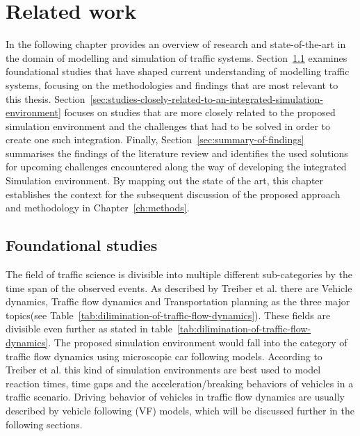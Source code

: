 \chapter{Related work}\label{ch:related-work}
    In the following chapter provides an overview of research and state-of-the-art in the domain of modelling and simulation of traffic systems.
    Section~\ref{sec:foundational-studies} examines foundational studies that have shaped current understanding of modelling traffic systems, focusing on the methodologies and findings that are most relevant to this thesis.
    Section~\ref{sec:studies-closely-related-to-an-integrated-simulation-environment} focuses on studies that are more closely related to the proposed simulation environment and the challenges that had to be solved in order to create one such integration.
    Finally, Section~\ref{sec:summary-of-findings} summarises the findings of the literature review and identifies the used solutions for upcoming challenges encountered along the way of developing the integrated Simulation environment.
    By mapping out the state of the art, this chapter establishes the context for the subsequent discussion of the proposed approach and methodology in Chapter~\ref{ch:methods}.


    \section{Foundational studies}\label{sec:foundational-studies}
        The field of traffic science is divisible into multiple different sub-categories by the time span of the observed events.
        As described by Treiber et al. \cite{treiber2013traffic} there are Vehicle dynamics, Traffic flow dynamics and Transportation planning as the three major topics(see Table~\ref{tab:dilimination-of-traffic-flow-dynamics}).
        These fields are divisible even further as stated in table~\ref{tab:dilimination-of-traffic-flow-dynamics}.
        The proposed simulation environment would fall into the category of traffic flow dynamics using microscopic car following models.
        According to Treiber et al. this kind of simulation environments are best used to model reaction times, time gaps and the acceleration/breaking behaviors of vehicles in a traffic scenario.
        Driving behavior of vehicles in traffic flow dynamics are usually described by vehicle following (VF) models, which will be discussed further in the following sections.

